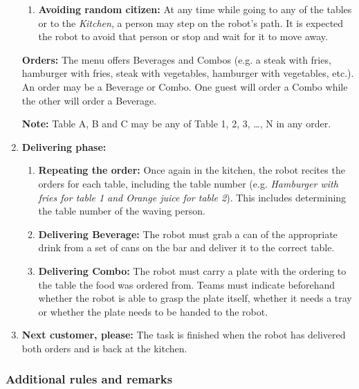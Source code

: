 \begin{enumerate}
\begin{enumerate}
\item \textbf{Avoiding random citizen:} At any time while going to any of the tables or to the \textit{Kitchen}, a person may step on the robot's path. It is expected the robot to avoid that person or stop and wait for it to move away.
\end{enumerate}

\textbf{Orders:} The menu offers Beverages and Combos (e.g. a steak with fries, hamburger with fries, steak with vegetables, hamburger with vegetables, etc.). An order may be a Beverage or Combo. One guest will order a Combo while the other will order a Beverage.

\textbf{Note:} Table A, B and C may be any of Table 1, 2, 3, \dots, N in any order.

\item \textbf{Delivering phase:}
\begin{enumerate}
\item \textbf{Repeating the order:} Once again in the kitchen, the robot recites the orders for each table, including the table number (e.g. \textit{Hamburger with fries for table 1 and Orange juice for table 2}). This includes determining the table number of the waving person.

\item \textbf{Delivering Beverage:} The robot must grab a can of the appropriate drink from a set of cans on the bar and deliver it to the correct table.

\item \textbf{Delivering Combo:}  The robot must carry a plate with the ordering to the table the food was ordered from. Teams must indicate beforehand whether the robot is able to grasp the plate itself, whether it needs a tray or whether the plate needs to be handed to the robot.
\end{enumerate}

\item \textbf{Next customer, please:} The task is finished when the robot has delivered both orders and is back at the kitchen.
\end{enumerate}

\subsubsection{Additional rules and remarks}

